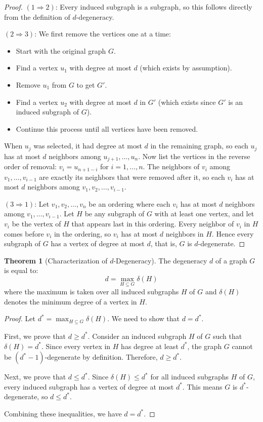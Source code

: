 \documentclass{article}
\theoremstyle{definition}
\newtheorem{theorem}{Theorem}
\begin{document}
\begin{proof}
$(1 \Rightarrow 2)$: Every induced subgraph is a subgraph, so this follows directly from the definition of $d$-degeneracy.

$(2 \Rightarrow 3)$: We first remove the vertices one at a time:
\begin{itemize}
\item Start with the original graph $G$.
\item Find a vertex $u_1$ with degree at most $d$ (which exists by assumption).
\item Remove $u_1$ from $G$ to get $G'$.
\item Find a vertex $u_2$ with degree at most $d$ in $G'$ (which exists since $G'$ is an induced subgraph of $G$).
\item Continue this process until all vertices have been removed.
\end{itemize}

When $u_j$ was selected, it had degree at most $d$ in the remaining graph, so each $u_j$ has at most $d$ neighbors among $u_{j+1}, \ldots, u_n$. Now list the vertices in the reverse order of removal: $v_i = u_{n+1-i}$ for $i = 1, \ldots, n$. The neighbors of $v_i$ among $v_1, \ldots, v_{i-1}$ are exactly its neighbors that were removed after it, so each $v_i$ has at most $d$ neighbors among $v_1, v_2, \ldots, v_{i-1}$.

$(3 \Rightarrow 1)$: Let $v_1, v_2, \ldots, v_n$ be an ordering where each $v_i$ has at most $d$ neighbors among $v_1, \ldots, v_{i-1}$. Let $H$ be any subgraph of $G$ with at least one vertex, and let $v_i$ be the vertex of $H$ that appears last in this ordering. Every neighbor of $v_i$ in $H$ comes before $v_i$ in the ordering, so $v_i$ has at most $d$ neighbors in $H$. Hence every subgraph of $G$ has a vertex of degree at most $d$, that is, $G$ is $d$-degenerate.
\end{proof}

\begin{theorem}[Characterization of $d$-Degeneracy]
The degeneracy $d$ of a graph $G$ is equal to:
\begin{equation}
d = \max_{H \subseteq G} \delta(H)
\end{equation}
where the maximum is taken over all induced subgraphs $H$ of $G$ and $\delta(H)$ denotes the minimum degree of a vertex in $H$.
\end{theorem}

\begin{proof}
Let $d^* = \max_{H \subseteq G} \delta(H)$. We need to show that $d = d^*$.

First, we prove that $d \geq d^*$. Consider an induced subgraph $H$ of $G$ such that $\delta(H) = d^*$. Since every vertex in $H$ has degree at least $d^*$, the graph $G$ cannot be $(d^*-1)$-degenerate by definition. Therefore, $d \geq d^*$.

Next, we prove that $d \leq d^*$. Since $\delta(H) \leq d^*$ for all induced subgraphs $H$ of $G$, every induced subgraph has a vertex of degree at most $d^*$. This means $G$ is $d^*$-degenerate, so $d \leq d^*$.

Combining these inequalities, we have $d = d^*$.
\end{proof}
\end{document}
